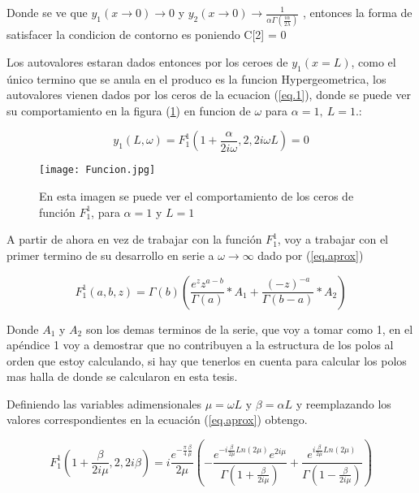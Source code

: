 Donde se ve que $y _1 (x \rightarrow 0 ) \rightarrow 0$ y $y _2 (x \rightarrow 0)  \rightarrow
\frac{1}{  \alpha   \Gamma ( \frac{i \alpha}{2 \lambda}  )   } $ , entonces la forma de satisfacer la condicion de contorno es poniendo C[2] = 0

Los autovalores estaran dados entonces por los ceroes de $y_1 (x= L)$, como el único termino que se anula en el produco es la funcion Hypergeometrica, los autovalores vienen dados por los ceros de la ecuacion (\ref{eq.1}), donde se puede ver su comportamiento en la figura (\ref{fig:funcion}) en funcion de $\omega$ para  $\alpha=1, \ L=1$.:


\begin{equation}
y_1 (L, \omega) = F _1 ^1 (1+\frac{ \alpha}{2 i \omega},2,2 i \omega L)  = 0
\label{eq.1}
\end{equation}

\begin{figure}
\centering
\texttt{[image: Funcion.jpg]}
\caption{En esta imagen se puede ver el comportamiento de los ceros de función $F _1 ^1$, para $\alpha=1$ y $L=1$}
\label{fig:funcion}
\end{figure}

A partir de ahora en vez de trabajar con la función $F _1 ^1$, voy a trabajar con el primer termino de su desarrollo en serie a $ \omega \rightarrow \infty  $ dado por (\ref{eq.aprox}) 

\begin{equation}
    F _1 ^1 (a,b,z) = \Gamma (b) 
    \left(
    \frac{e^z z ^{a-b} }{\Gamma(a)} * A_1 + \frac{(-z) ^{ -a}}{ \Gamma(b-a)} 
    * A_2
    \right)
\label{eq.aprox}
\end{equation}

Donde $A_1$ y $A_2$ son los demas terminos de la serie, que voy a tomar como 1, en el apéndice 1 voy a demostrar que no contribuyen a la estructura de los polos al orden que estoy calculando, si hay que tenerlos en cuenta para calcular los polos mas halla de donde se calcularon en esta tesis.

Definiendo las variables adimensionales $\mu = \omega L$  y $\beta = \alpha L $ y reemplazando los valores correspondientes en la ecuación (\ref{eq.aprox}) obtengo. 

\begin{equation}
    F _1 ^1 (1+  \frac{  \beta}{2 i \mu} ,2 ,2 i \beta ) = 
   i  \frac{e ^{- \frac{\pi}{4} \frac{\beta}{\mu} } }{2 \mu}
    \left( -
    \frac{e ^{- i \frac{\beta}{2 \mu} Ln(2 \mu) } e ^{2 i \mu} }{\Gamma(1+\frac{ \beta}{2 i \mu})} +
    \frac{e ^{  i \frac{\beta}{2 \mu} Ln(2 \mu) }}               {\Gamma(1-\frac{ \beta}{2 i \mu})}
    \right)
\label{eq.completa}
\end{equation}




